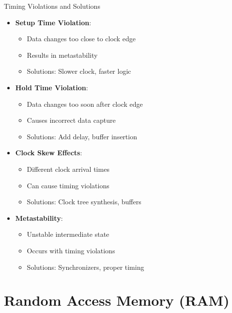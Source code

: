 \documentclass[aspectratio=169,11pt]{beamer}
\newcommand{\concept}[1]{\textbf{\color{accentcolor}#1}}
\begin{document}
\begin{frame}{Timing Violations and Solutions}
\begin{itemize}
\item \concept{Setup Time Violation}:
\begin{itemize}
\item Data changes too close to clock edge
\item Results in metastability
\item Solutions: Slower clock, faster logic
\end{itemize}
\vspace{0.3cm}
\item \concept{Hold Time Violation}:
\begin{itemize}
\item Data changes too soon after clock edge
\item Causes incorrect data capture
\item Solutions: Add delay, buffer insertion
\end{itemize}
\vspace{0.3cm}
\item \concept{Clock Skew Effects}:
\begin{itemize}
\item Different clock arrival times
\item Can cause timing violations
\item Solutions: Clock tree synthesis, buffers
\end{itemize}
\vspace{0.3cm}
\item \concept{Metastability}:
\begin{itemize}
\item Unstable intermediate state
\item Occurs with timing violations
\item Solutions: Synchronizers, proper timing
\end{itemize}
\end{itemize}
\end{frame}

\section{Random Access Memory (RAM)}
\end{document}
